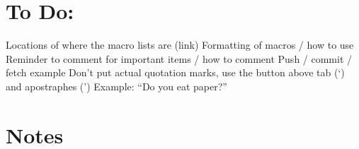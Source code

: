 

\section*{To Do:}
Locations of where the macro lists are (link)
Formatting of macros / how to use
Reminder to comment for important items / how to comment
Push / commit / fetch example
Don't put actual quotation marks, use the button above tab (`) and apostraphes (')
	Example: ``Do you eat paper?''

\section*{Notes}


